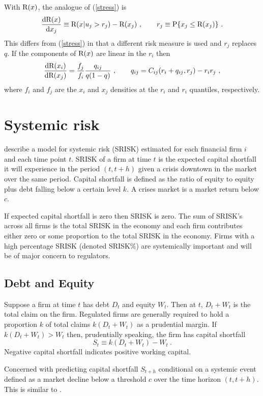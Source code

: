 \documentclass[authoryear]{elsarticle}
\newcommand{\p}{\mathrm{P}}
\newcommand{\de}{\mathrm{d}}
\newcommand{\eref}[1]{(\ref{#1})}
\newcommand{\cq}{\ , \qquad}
\newcommand{\be}[1]{\begin{equation}\label{#1}}
\newcommand{\ee}{\end{equation}}
\begin{document}
With $\mathrm{R}(x)$, the analogue of \eref{stress} is 
\be{stress2}
\frac{\de\r(x)}{\de x_j} \equiv \r(x|u_j>r_j) - \r(x_j)\cq r_j\equiv\p\{x_j\le\r(x_j)\} \ .
\ee
This differs from \eref{stress}  in that a different risk measure is used and  $r_j$ replaces $q$.   If  the components of $\mathrm{R}(x)$ are linear in the $r_i$ then
\be{implicit2}
\frac{\de\r(x_i)}{\de\r(x_j)} =  
\frac{f_j}{f_i} 
 \frac{q_{ij}}{q(1-q)}\cq q_{ij}=C_{ij}(r_i+q_{ij},r_j) - r_ir_j\ ,
\ee
where $f_i$ and $f_j$ are the $x_i$ and $x_j$ densities at the $r_i$ and $r_i$ quantiles, respectively. 

\section{Systemic risk}
\cite{brownlees2015} describe a model for systemic risk (SRISK) estimated for each financial firm $i$ and each time point $t$.    SRISK of a firm at time $t$ is the expected capital shortfall  it will experience in the period $(t,t+h)$ given a crisis downtown in the market over the same period.    Capital shortfall is defined as the ratio of equity to equity plus debt falling below a certain level $k$.  A crises market is a market return below $c$. 

If expected capital shortfall  is zero then SRISK is zero.   The sum of  SRISK's  across all firms is the total SRISK in the economy and each firm contributes either zero or some proportion to the total SRISK in the economy.    Firms with a high  percentage SRISK (denoted SRISK\%) are systemically important and will be  of major concern to regulators. 




\subsection{Debt and Equity}

Suppose a firm at time $t$ has debt $D_t$ and equity $W_t$.   Then at $t$, $D_t+W_t$ is the total claim on the firm. 
Regulated firms are generally required to hold a proportion $k$ of total claims $k(D_t+W_t)$ as a prudential margin.    If  $k(D_t+W_t)>W_t$ then, prudentially speaking, the firm has capital shortfall   
$$S_t\equiv k(D_t+W_t)-W_t\ .
$$  
Negative capital shortfall indicates positive working capital.

Concerned with predicting capital shortfall $S_{t+h}$ conditional on a systemic event defined as a market decline below a threshold $c$ over the time horizon $(t,t+h)$.  This is similar to \cite{acharya2012wp}.
\end{document}

